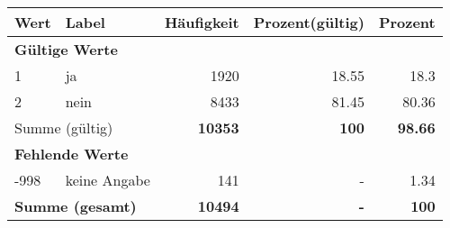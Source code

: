      \begin{longtable}{lXrrr}
     \toprule
     \textbf{Wert} & \textbf{Label} & \textbf{Häufigkeit} & \textbf{Prozent(gültig)} & \textbf{Prozent} \\
     \endhead
     \midrule
     \multicolumn{5}{l}{\textbf{Gültige Werte}}\\

     1 &
     \multicolumn{1}{X}{ ja   } &


       \num{1920} &
       \num[round-mode=places,round-precision=2]{18,55} &
         \num[round-mode=places,round-precision=2]{18,3} \\

     2 &
     \multicolumn{1}{X}{ nein   } &


       \num{8433} &
       \num[round-mode=places,round-precision=2]{81,45} &
         \num[round-mode=places,round-precision=2]{80,36} \\
     \midrule
     \multicolumn{2}{l}{Summe (gültig)} &
       \textbf{\num{10353}} &
     \textbf{100} &
       \textbf{\num[round-mode=places,round-precision=2]{98,66}} \\
     \multicolumn{5}{l}{\textbf{Fehlende Werte}}\\
       -998 &
       keine Angabe &
         \num{141} &
        - &
         \num[round-mode=places,round-precision=2]{1,34} \\
     \midrule
     \multicolumn{2}{l}{\textbf{Summe (gesamt)}} &
          \textbf{\num{10494}} &
        \textbf{-} &
        \textbf{100} \\
     \bottomrule
     \end{longtable}
     
